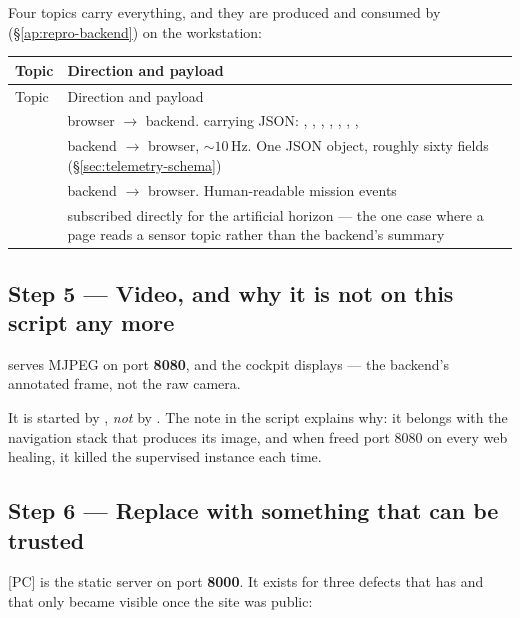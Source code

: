 Four topics carry everything, and they are produced and consumed by
 (\S\ref{ap:repro-backend}) on the workstation:

\begin{longtable}{@{}L{5.0cm}L{8.6cm}@{}}
\toprule
Topic & Direction and payload \\
\midrule
\endfirsthead
\toprule
Topic & Direction and payload \\
\midrule
\endhead
{} &
  browser $\rightarrow$ backend.  carrying JSON:
  , , , ,
  , , ,  \\
\addlinespace
{} &
  backend $\rightarrow$ browser, ${\sim}10$\,Hz. One JSON object, roughly
  sixty fields (\S\ref{sec:telemetry-schema}) \\
\addlinespace
{} &
  backend $\rightarrow$ browser. Human-readable mission events \\
\addlinespace
{} &
  subscribed directly for the artificial horizon --- the one case where a
  page reads a sensor topic rather than the backend's summary \\
\bottomrule
\end{longtable}

\subsection{Step 5 --- Video, and why it is not on this script any more}
\label{ap:repro-web-video}

 serves MJPEG on port \textbf{8080}, and the cockpit
displays  --- the backend's annotated frame,
not the raw camera.

It is started by , \emph{not} by
. The note in the script explains why: it belongs with the
navigation stack that produces its image, and when  freed
port 8080 on every web healing, it killed the supervised instance each time.

\subsection{Step 6 --- Replace  with something that can be trusted}
\label{ap:repro-web-serve}

 [PC] is the static server on port \textbf{8000}. It exists
for three defects that  has and that only became
visible once the site was public:

